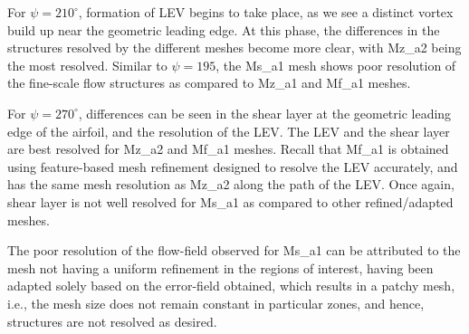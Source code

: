 



For $\psi=210^\circ$, formation of LEV begins to take place, as we see a distinct vortex build up near the geometric leading edge. At this phase, the differences in the structures resolved by the different meshes become more clear, with Mz\_a2 being the most resolved. Similar to $\psi=195$, the Ms\_a1 mesh shows poor resolution of the fine-scale flow structures as compared to  Mz\_a1 and Mf\_a1 meshes.

For $\psi=270^\circ$, differences can be seen in the shear layer at the geometric leading edge of the airfoil, and the resolution of the LEV. The LEV and the shear layer are best resolved for Mz\_a2 and Mf\_a1 meshes. Recall that Mf\_a1 is obtained using feature-based mesh refinement designed to resolve the LEV accurately, and has the same mesh resolution as Mz\_a2 along the path of the LEV. Once again, shear layer is not well resolved for Ms\_a1 as compared to other refined/adapted meshes.

The poor resolution of the flow-field observed for Ms\_a1 can be attributed to the mesh not having a uniform refinement in the regions of interest, having been adapted solely based on the error-field obtained, which results in a patchy mesh, i.e., the mesh size does not remain constant in particular zones, and hence, structures are not resolved as desired.

